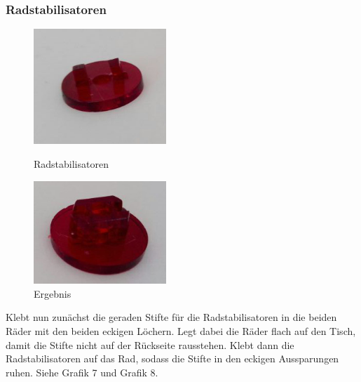 \documentclass[12pt,a4paper]{article}
\begin{document}
\subsubsection{Radstabilisatoren}
\begin{figure}[h]
	\begin{minipage}{0.33\textwidth}
		\includegraphics[width=5cm]{./graphics/radstabilisatoren}
		\caption{Radstabilisatoren}
	\end{minipage}
	\begin{minipage}{0.33\textwidth}
		\includegraphics[width=5cm]{./graphics/fertige_radstabilisatoren}
		\caption{Ergebnis}
	\end{minipage}
\end{figure}

Klebt nun zunächst die geraden Stifte für die Radstabilisatoren in die beiden Räder mit den beiden eckigen Löchern. Legt dabei die Räder flach auf den Tisch, damit die Stifte nicht auf der Rückseite rausstehen. Klebt dann die Radstabilisatoren auf das Rad, sodass die Stifte in den eckigen Aussparungen ruhen. Siehe Grafik 7 und Grafik 8.
\end{document}
